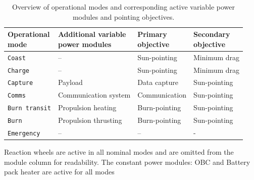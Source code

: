 \newcommand{\datarowheight}{\rule[-0.8em]{0pt}{3.2em}}
\begin{table}[htbp]
    \centering
    \caption{Overview of operational modes and corresponding active variable power modules and pointing objectives.}
    \begin{tabular}{llll}
        \toprule
        \makecell[l]{Operational\\mode} &
        \makecell[l]{Additional variable\\power modules} &
        \makecell[l]{Primary\\objective} &
        \makecell[l]{Secondary\\objective} \\
        \midrule
        \texttt{Coast} & -- & Sun-pointing & Minimum drag \\
        \texttt{Charge} & -- & Sun-pointing & Minimum drag \\
        \texttt{Capture} & Payload & Data capture & Sun-pointing \\
        \texttt{Comms} & Communication system & Communication & Sun-pointing \\
        \texttt{Burn transit} & Propulsion heating & Burn-pointing & Sun-pointing \\
        \texttt{Burn} & Propulsion thrusting & Burn-pointing & Sun-pointing \\
        \texttt{Emergency} & -- & -- & - \\
        \bottomrule
    \end{tabular}

    \vspace{0.5em}
    \footnotesize
    Reaction wheels are active in all nominal modes and are omitted from the module column for readability. The constant power modules: OBC and Battery pack heater are active for all modes
\label{tab:operational_mode_overview} 
\end{table}



